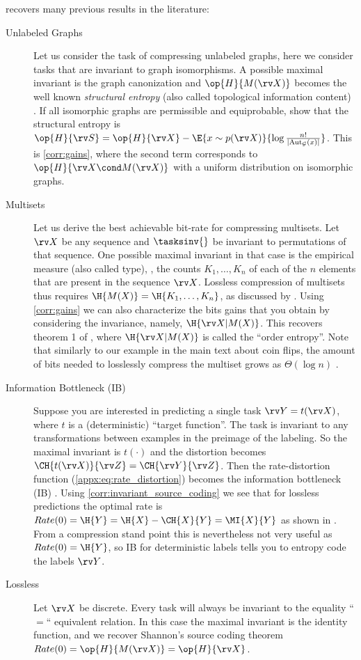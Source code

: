 \documentclass[final]{article}
\begin{document}
 recovers many previous results in the literature:
\begin{description}
\item[Unlabeled Graphs] 
Let us consider the task of compressing unlabeled graphs, here we consider tasks that are invariant to graph isomorphisms.
A possible maximal invariant is the graph canonization and $\op{H}{M(\rv X)}$ becomes the well known \textit{structural entropy} (also called topological information content) \cite{rashevsky_life_1955,yongwook_choi_compression_2009}.
If all isomorphic graphs are permissible and equiprobable, \citet{yongwook_choi_compression_2009} show that the structural entropy is  $\op{H}{\rv S} = \op{H}{\rv X} - \E{x \sim p(\rv X) }{\log \frac{n!}{|\mathrm{Aut}_{\mathcal{G}}(x)|}}$.
This is \cref{corr:gains}, where the second term corresponds to $\op{H}{\rv X \cond M(\rv X)}$ with a uniform distribution on isomorphic graphs.
\item[Multisets] 
Let us derive the best achievable bit-rate for compressing multisets.
Let $\rv X$ be any sequence and $\tasksinv{}$ be invariant to permutations of that sequence.
One possible maximal invariant in that case is the empirical measure (also called type), \ie, the counts $K_1,\dots,K_n$ of each of the $n$ elements that are present in the sequence $\rv X$.
Lossless compression of multisets thus requires $\H{M(X)}=\H{K_1,\dots,K_n}$, as discussed by \citet{varshney_benefiting_2007}.
Using \cref{corr:gains} we can also characterize the bits gains that you obtain by considering the invariance, namely, $\H{\rv X | M(X)}$.
This recovers theorem 1 of \citet{varshney_benefiting_2007}, where $\H{\rv X | M(X)}$ is called the ``order entropy''.
Note that similarly to our example in the main text about \iid coin flips, the amount of bits needed to losslessly compress the multiset grows as $\Theta(\log n)$  \cite{varshney_benefiting_2007}. 
\item[Information Bottleneck (IB)] 
Suppose you are interested in predicting a single task $\rv Y = t(\rv X)$, where $t$ is a (deterministic) ``target function''.
The task is invariant to any transformations between examples in the preimage of the labeling.
So the maximal invariant is $t(\cdot)$ and the distortion becomes $\CH{t(\rv X)}{\rv Z}=\CH{\rv Y}{\rv Z}$.
Then the rate-distortion function (\cref{appx:eq:rate_distortion}) becomes the information bottleneck (IB) \cite{tishby_information_2000}.
Using \cref{corr:invariant_source_coding} we see that for lossless predictions the optimal rate is $Rate(0) = \H{Y} = \H{X} - \CH{X}{Y} = \MI{X}{Y} $ as  shown in \cite{wu_learnability_2019,fischer_conditional_2020}.
From a compression stand point this is nevertheless not very useful as $Rate(0) = \H{Y}$, so IB for deterministic labels tells you to entropy code the labels $\rv Y$. 
\item[Lossless]
Let $\rv X$ be discrete.
Every task will always be invariant to the equality ``$=$`` equivalent relation.
In this case the maximal invariant is the identity function, and we recover Shannon's source coding theorem $Rate(0) = \op{H}{M(\rv X)}=\op{H}{\rv X}$.
\end{description}
\end{document}
